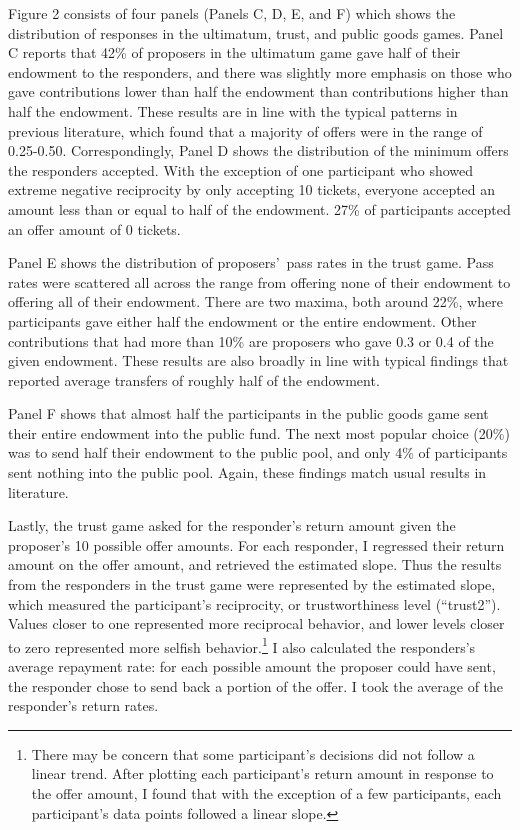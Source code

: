 \documentclass[12pt]{article}
\begin{document}
Figure 2 consists of four panels (Panels C, D, E, and F) which shows the distribution of responses in the ultimatum, trust, and public goods games. Panel C reports that 42\% of proposers in the ultimatum game gave half of their endowment to the responders, and there was slightly more emphasis on those who gave contributions lower than half the endowment than contributions higher than half the endowment. These results are in line with the typical patterns in previous literature, which found that a majority of offers were in the range of 0.25-0.50. Correspondingly, Panel D shows the distribution of the minimum offers the responders accepted. With the exception of one participant who showed extreme negative reciprocity by only accepting 10 tickets, everyone accepted an amount less than or equal to half of the endowment. 27\% of participants accepted an offer amount of 0 tickets. 

Panel E shows the distribution of proposers\rq \ pass rates in the trust game. Pass rates were scattered all across the range from offering none of their endowment to offering all of their endowment. There are two maxima, both around 22\%, where participants gave either half the endowment or the entire endowment. Other contributions that had more than 10\% are proposers who gave 0.3 or 0.4 of the given endowment. These results are also broadly in line with typical findings that reported average transfers of roughly half of the endowment.

Panel F shows that almost half the participants in the public goods game sent their entire endowment into the public fund. The next most popular choice (20\%) was to send half their endowment to the public pool, and only 4\% of participants sent nothing into the public pool. Again, these findings match usual results in literature.

Lastly, the trust game asked for the responder\rq s return amount given the proposer\rq s 10 possible offer amounts. For each responder, I regressed their return amount on the offer amount, and retrieved the estimated slope. Thus the results from the responders in the trust game were represented by the estimated slope, which measured the participant\rq s reciprocity, or trustworthiness level (``trust2''). Values closer to one represented more reciprocal behavior, and lower levels closer to zero represented more selfish behavior.\footnote{There may be concern that some participant\rq s decisions did not follow a linear trend. After plotting each participant\rq s return amount in response to the offer amount, I found that with the exception of a few participants, each participant\rq s data points followed a linear slope.} I also calculated the responders\rq s average repayment rate: for each possible amount the proposer could have sent, the responder chose to send back a portion of the offer. I took the average of the responder\rq s return rates.
\end{document}
